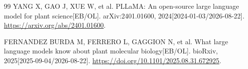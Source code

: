 \begin{thebibliography}{99}
YANG X, GAO J, XUE W, et al.
PLLaMA: An open-source large language model for plant science[EB/OL].
arXiv:2401.01600, 2024[2024-01-03/2026-08-22].
\url{https://arxiv.org/abs/2401.01600}.

FERNANDEZ BURDA M, FERRERO L, GAGGION N, et al.
What large language models know about plant molecular biology[EB/OL].
bioRxiv, 2025[2025-09-04/2026-08-22].
\url{https://doi.org/10.1101/2025.08.31.672925}.

\end{thebibliography}

